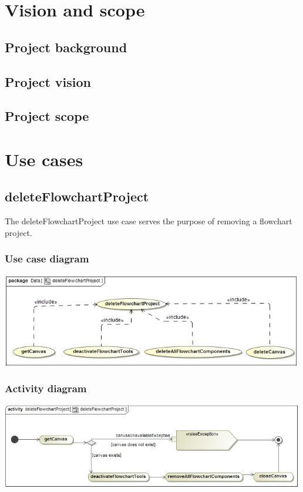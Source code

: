 \documentclass[11pt,a4paper,titlepage]{article}
\begin{document}


\tableofcontents
\pagebreak

\section{Vision and scope}
\subsection{Project background}
\subsection{Project vision}
\subsection{Project scope}



\newpage	
\section{Use cases}
	
\subsection{deleteFlowchartProject}
The deleteFlowchartProject use case serves the purpose of removing a flowchart project.

\subsubsection{Use case diagram}
\includegraphics[width=500px]{deleteFlowchartProjectUseCase.jpg}

\subsubsection{Activity diagram}
\includegraphics[width=500px]{deleteFlowchartProject.jpg}





	
\end{document}
